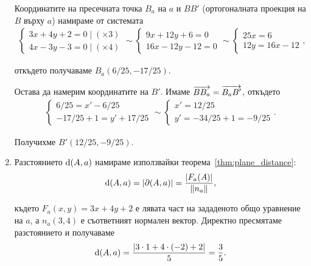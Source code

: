 \documentclass[numbers=endperiod, bibliography=totocnumbered]{scrartcl}
\begin{document}
\begin{solution}
\begin{enumerate}[label=\alph*)]
    Координатите на пресечната точка \( B_a \) на \( a \) и \( BB' \) (ортогоналната проекция на \( B \) върху \( a \)) намираме от системата
    \begin{align*}
      \begin{cases}
        3x + 4y + 2 = 0 \mid (\times 3) \\
        4x - 3y - 3 = 0 \mid (\times 4)
      \end{cases}
      \sim
      \begin{cases}
        9x + 12y + 6 = 0 \\
        16x - 12y - 12 = 0
      \end{cases}
      \sim
      \begin{cases}
        25x = 6 \\
        12y = 16x - 12
      \end{cases},
    \end{align*}

    откъдето получаваме \( B_a(6/25, -17/25) \).

    Остава да намерим координатите на \( B' \). Имаме \( \overrightarrow{BB_a} = \overrightarrow{B_a B'} \), откъдето
    \begin{align*}
      \begin{cases}
        6/25 = x' - 6/25 \\
        -17/25 + 1 = y' + 17/25
      \end{cases}
      \sim
      \begin{cases}
        x' = 12/25 \\
        y' = -34/25 + 1 = -9/25
      \end{cases}.
    \end{align*}

    Получихме \( B'(12/25, -9/25) \).

    \item Разстоянието \( \operatorname{d}(A, a) \) намираме използвайки теорема~\ref{thm:plane_distance}:
    \begin{align*}
      \operatorname{d}(A, a) = \left\vert \partial(A, a) \right\vert = \frac {\left\vert F_a(A) \right\vert} {\left\Vert n_a \right\Vert},
    \end{align*}

    където \( F_a(x, y) = 3x + 4y + 2 \) е лявата част на зададеното общо уравнение на \( a \), а \( n_a(3, 4) \) е съответният нормален вектор. Директно пресмятаме разстоянието и получаваме
    \begin{align*}
      \operatorname{d}(A, a) = \frac {\left\vert 3 \cdot 1 + 4 \cdot (-2) + 2 \right\vert} 5 = \frac 3 5.
    \end{align*}


\end{enumerate}
\end{solution}
\end{document}

